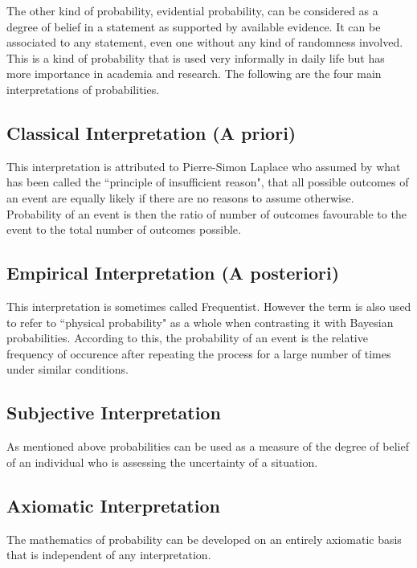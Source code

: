 \documentclass{../template/texnote}
\begin{document}
The other kind of probability, evidential probability, can be considered as a degree of belief in a statement as supported by available evidence.
It can be associated to any statement, even one without any kind of randomness involved.
This is a kind of probability that is used very informally in daily life but has more importance in academia and research.
The following are the four main interpretations of probabilities.
\subsection{Classical Interpretation (A priori)}
This interpretation is attributed to Pierre-Simon Laplace who assumed by what has been called the ``principle of insufficient reason", that all possible outcomes of an event are equally likely if there are no reasons to assume otherwise.
Probability of an event is then the ratio of number of outcomes favourable to the event to the total number of outcomes possible.

\subsection{Empirical Interpretation (A posteriori)}
This interpretation is sometimes called Frequentist. However the term is also used to refer to ``physical probability" as a whole when contrasting it with Bayesian probabilities.
According to this, the probability of an event is the relative frequency of occurence after repeating the process for a large number of times under similar conditions.

\subsection{Subjective Interpretation}
As mentioned above probabilities can be used as a measure of the degree of belief of an individual who is assessing the uncertainty of a situation.

\subsection{Axiomatic Interpretation}

The mathematics of probability can be developed on an entirely axiomatic basis that is independent of any interpretation.
\end{document}
